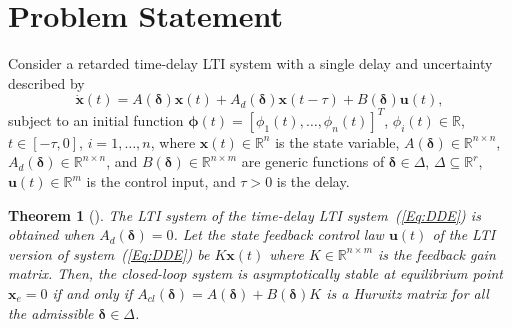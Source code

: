 \documentclass[journal]{IEEEtran}
\newtheorem{thm}{Theorem}
\begin{document}


\section{Problem Statement} \label{sect:prob}


Consider a retarded time-delay LTI system with a single delay and uncertainty described by
\begin{equation}\label{Eq:DDE}
	\dot {\mathbf x}(t)=A(\boldsymbol \delta) \mathbf x(t)+A_d(\boldsymbol \delta) \mathbf x(t-\tau)+ B(\boldsymbol \delta) \mathbf u(t),
\end{equation}
subject to an initial function $\boldsymbol{\phi} (t) =[\phi_1(t),\ldots,\phi_n(t)]^T$, $ \phi_i(t) \in \mathbb R$, $ t\in[-\tau,0] $, $ i=1,\ldots,n $, where $\mathbf x (t)\in \mathbb{R}^{n}$ is the state variable, $ A (\boldsymbol \delta) \in \mathbb R^{n \times n}$, $ A_d (\boldsymbol \delta) \in \mathbb R^{n \times n}$, and $ B (\boldsymbol \delta) \in \mathbb R^{n \times m} $ are generic functions of $\boldsymbol \delta \in \Delta$, $\Delta \subseteq \mathbb R ^ r$, $\mathbf u (t)\in \mathbb{R}^{m}$ is the control input, and $ \tau>0 $ is the delay.



\begin{thm}[\cite{Calafiore2006scenario}]
	The LTI system of the time-delay LTI system~(\ref{Eq:DDE}) is obtained when $ A_d (\boldsymbol \delta)=0 $. Let the state feedback control law $ \mathbf u(t)$ of the LTI version of system~(\ref{Eq:DDE}) be $ K\mathbf x(t) $ where $K \in \mathbb{R}^{n\times m}$ is the feedback gain matrix. Then, the closed-loop system is asymptotically stable at equilibrium point $ \mathbf x_e=0 $ if and only if $A_{cl}(\boldsymbol\delta)=A(\boldsymbol\delta)+ B(\boldsymbol \delta) K $ is a Hurwitz matrix for all the admissible $ \boldsymbol\delta \in \Delta $.
\end{thm}
\end{document}
